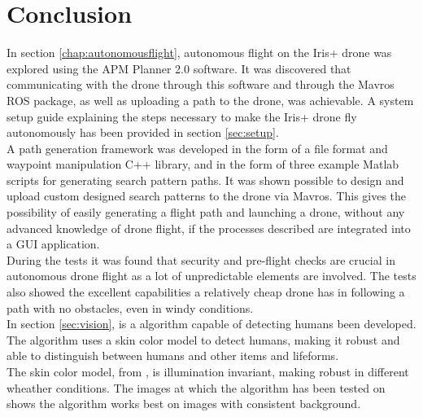 \chapter{Conclusion}

In section \ref{chap:autonomousflight}, autonomous flight on the Iris+ drone was explored using the APM Planner 2.0 software.
It was discovered that communicating with the drone through this software and through the Mavros ROS package,
as well as uploading a path to the drone, was achievable.
A system setup guide explaining the steps necessary to make the Iris+ drone fly autonomously has been provided in section \ref{sec:setup}.
\\
A path generation framework was developed in the form of a file format and waypoint manipulation C++ library,
and in the form of three example Matlab scripts for generating search pattern paths.
It was shown possible to design and upload custom designed search patterns to the drone via Mavros.
This gives the possibility of easily generating a flight path and launching a drone, without any advanced knowledge of drone flight,
if the processes described are integrated into a GUI application.\\

During the tests it was found that security and pre-flight checks are crucial in autonomous drone flight
as a lot of unpredictable elements are involved.
The tests also showed the excellent capabilities a relatively cheap drone has in following a path with no obstacles, even in windy conditions.\\

In section \ref{sec:vision}, is a algorithm capable of detecting humans been developed. 
The algorithm uses a skin color model to detect humans, making it robust and able to distinguish between humans and other items and lifeforms.\\
 
The skin color model, from \cite{Ref:SkinDetection}, is illumination invariant, making robust in different wheather conditions. 
The images at which the algorithm has been tested on  shows the algorithm works best on images with consistent background.
\newpage